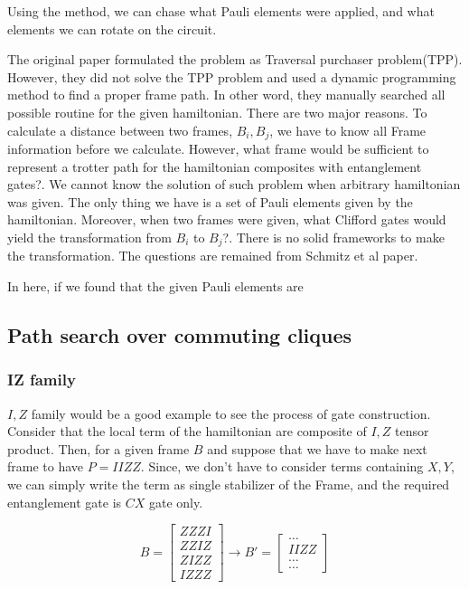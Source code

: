 \documentclass[a4paper,12pt]{article}
\begin{document}
Using the method, we can chase what Pauli elements were applied, 
and what elements we can rotate on the circuit.


The original paper formulated the problem as 
Traversal purchaser problem(TPP)\cite{schmitz_graph_2023}.
However, they did not solve the TPP problem and 
used a dynamic programming method to find a proper frame path.
In other word, they manually searched all possible routine
for the given hamiltonian.
There are two major reasons.
To calculate a distance between two frames, $B_i, B_j$, we have to know
all Frame information before we calculate.
However, what frame would be sufficient to represent a trotter path 
for the hamiltonian composites with entanglement gates?.
We cannot know the solution of such problem when arbitrary hamiltonian was given.
The only thing we have is a set of Pauli elements given by the hamiltonian.
Moreover, when two frames were given, what Clifford gates would yield the 
transformation from $B_i$ to $B_j$?.
There is no solid frameworks to make the transformation.
The questions are remained from Schmitz et al paper.

In here, if we found that the given Pauli elements are 

\subsection{Path search over commuting cliques}

\subsubsection{IZ family}

$I, Z$ family would be a good example to see the process of gate construction.
Consider that the local term of the hamiltonian are composite of $I, Z$ tensor product.
Then, for a given frame $B$ and suppose that we have to make next frame to have $P = IIZZ$.
Since, we don't have to consider terms containing $X, Y$, we can simply write the term 
as single stabilizer of the Frame, and the required entanglement gate is $CX$ gate only.

\begin{equation}
    B = \begin{bmatrix}
        ZZZI\\
        ZZIZ\\
        ZIZZ\\
        IZZZ
    \end{bmatrix}
    \rightarrow B' = \begin{bmatrix}
        \dots\\
        IIZZ\\
        \dots\\
        \dots
    \end{bmatrix}
\end{equation}
\end{document}
